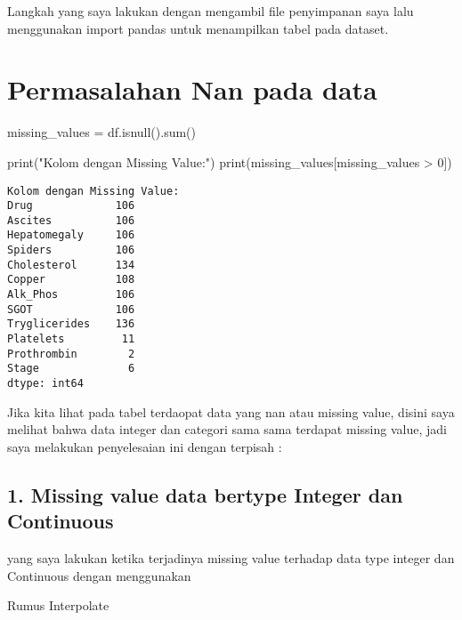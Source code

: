 \documentclass[
  letterpaper,
]{krantz}
\makeatletter
\newenvironment{Shaded}{\begin{snugshade}}{\end{snugshade}}
\newcommand{\BuiltInTok}[1]{\textcolor[rgb]{0.00,0.23,0.31}{#1}}
\newcommand{\DecValTok}[1]{\textcolor[rgb]{0.68,0.00,0.00}{#1}}
\newcommand{\NormalTok}[1]{\textcolor[rgb]{0.00,0.23,0.31}{#1}}
\newcommand{\OperatorTok}[1]{\textcolor[rgb]{0.37,0.37,0.37}{#1}}
\newcommand{\StringTok}[1]{\textcolor[rgb]{0.13,0.47,0.30}{#1}}
\newenvironment{kframe}{%
\medskip{}
\setlength{\fboxsep}{.8em}
 \def\at@end@of@kframe{}%
 \ifinner\ifhmode%
  \def\at@end@of@kframe{\end{minipage}}%
  \begin{minipage}{\columnwidth}%
 \fi\fi%
 \def\FrameCommand##1{\hskip\@totalleftmargin \hskip-\fboxsep
 \colorbox{shadecolor}{##1}\hskip-\fboxsep
     \hskip-\linewidth \hskip-\@totalleftmargin \hskip\columnwidth}%
 \MakeFramed {\advance\hsize-\width
   \@totalleftmargin\z@ \linewidth\hsize
   \@setminipage}}%
 {\par\unskip\endMakeFramed%
 \at@end@of@kframe}
\renewenvironment{Shaded}{\begin{kframe}}{\end{kframe}}
\makeatother
\begin{document}
Langkah yang saya lakukan dengan mengambil file penyimpanan saya lalu
menggunakan import pandas untuk menampilkan tabel pada dataset.

\hypertarget{permasalahan-nan-pada-data}{%
\section*{Permasalahan Nan pada data}\label{permasalahan-nan-pada-data}}


\begin{Shaded}
\begin{Highlighting}[]
\NormalTok{missing\_values }\OperatorTok{=}\NormalTok{ df.isnull().}\BuiltInTok{sum}\NormalTok{()}


\BuiltInTok{print}\NormalTok{(}\StringTok{"Kolom dengan Missing Value:"}\NormalTok{)}
\BuiltInTok{print}\NormalTok{(missing\_values[missing\_values }\OperatorTok{\textgreater{}} \DecValTok{0}\NormalTok{])}
\end{Highlighting}
\end{Shaded}

\begin{verbatim}
Kolom dengan Missing Value:
Drug             106
Ascites          106
Hepatomegaly     106
Spiders          106
Cholesterol      134
Copper           108
Alk_Phos         106
SGOT             106
Tryglicerides    136
Platelets         11
Prothrombin        2
Stage              6
dtype: int64
\end{verbatim}

Jika kita lihat pada tabel terdaopat data yang nan atau missing value,
disini saya melihat bahwa data integer dan categori sama sama terdapat
missing value, jadi saya melakukan penyelesaian ini dengan terpisah :

\hypertarget{missing-value-data-bertype-integer-dan-continuous}{%
\subsection*{1. Missing value data bertype Integer dan
Continuous}\label{missing-value-data-bertype-integer-dan-continuous}}

yang saya lakukan ketika terjadinya missing value terhadap data type
integer dan Continuous dengan menggunakan

Rumus Interpolate
\end{document}
